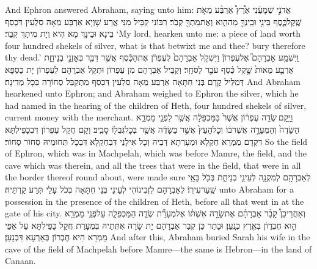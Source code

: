 {And Ephron answered Abraham, saying unto him:}{}
{אֲדֹנִ֣י שְׁמָעֵ֔נִי אֶ֩רֶץ֩ אַרְבַּ֨ע מֵאֹ֧ת שֶֽׁקֶל\maqqaf כֶּ֛סֶף בֵּינִ֥י וּבֵֽינְךָ֖ מַה\maqqaf הִ֑וא וְאֶת\maqqaf מֵתְךָ֖ קְבֹֽר׃}
{רִבּוֹנִי קַבֵּיל מִנִּי אֲרַע שָׁוְיָא אַרְבַּע מְאָה סִלְעִין דִּכְסַף בֵּינָא וּבֵינָךְ מָא הִיא וְיָת מִיתָךְ קְבַר׃}
{‘My lord, hearken unto me: a piece of land worth four hundred shekels of silver, what is that betwixt me and thee? bury therefore thy dead.’}{}
{וַיִּשְׁמַ֣ע אַבְרָהָם֮ אֶל\maqqaf עֶפְרוֹן֒ וַיִּשְׁקֹ֤ל אַבְרָהָם֙ לְעֶפְרֹ֔ן אֶת\maqqaf הַכֶּ֕סֶף אֲשֶׁ֥ר דִּבֶּ֖ר בְּאׇזְנֵ֣י בְנֵי\maqqaf חֵ֑ת אַרְבַּ֤ע מֵאוֹת֙ שֶׁ֣קֶל כֶּ֔סֶף עֹבֵ֖ר לַסֹּחֵֽר׃}
{וְקַבֵּיל אַבְרָהָם מִן עֶפְרוֹן וּתְקַל אַבְרָהָם לְעֶפְרוֹן יָת כַּסְפָּא דְּמַלֵּיל קֳדָם בְּנֵי חִתָּאָה אַרְבַּע מְאָה סִלְעִין דִּכְסַף מִתְקַבַּל סְחוֹרָה בְּכָל מְדִינָה׃}
{And Abraham hearkened unto Ephron; and Abraham weighed to Ephron the silver, which he had named in the hearing of the children of Heth, four hundred shekels of silver, current money with the merchant.}{}
{וַיָּ֣קׇם \legarmeh  שְׂדֵ֣ה עֶפְר֗וֹן אֲשֶׁר֙ בַּמַּכְפֵּלָ֔ה אֲשֶׁ֖ר לִפְנֵ֣י מַמְרֵ֑א הַשָּׂדֶה֙ וְהַמְּעָרָ֣ה אֲשֶׁר\maqqaf בּ֔וֹ וְכׇל\maqqaf הָעֵץ֙ אֲשֶׁ֣ר בַּשָּׂדֶ֔ה אֲשֶׁ֥ר בְּכׇל\maqqaf גְּבֻל֖וֹ סָבִֽיב׃}
{וְקָם חֲקַל עֶפְרוֹן דִּבְכָפֵילְתָּא דִּקְדָם מַמְרֵא חַקְלָא וּמְעָרְתָא דְּבֵיהּ וְכָל אִילָנֵי דִּבְחַקְלָא דִּבְכָל תְּחוּמֵיהּ סְחוֹר סְחוֹר׃}
{So the field of Ephron, which was in Machpelah, which was before Mamre, the field, and the cave which was therein, and all the trees that were in the field, that were in all the border thereof round about, were made sure}{}
{לְאַבְרָהָ֥ם לְמִקְנָ֖ה לְעֵינֵ֣י בְנֵי\maqqaf חֵ֑ת בְּכֹ֖ל בָּאֵ֥י שַֽׁעַר\maqqaf עִירֽוֹ׃}
{לְאַבְרָהָם לִזְבִינוֹהִי לְעֵינֵי בְּנֵי חִתָּאָה בְּכֹל עָלֵי תְּרַע קַרְתֵּיהּ׃}
{unto Abraham for a possession in the presence of the children of Heth, before all that went in at the gate of his city.}{}
{וְאַחֲרֵי\maqqaf כֵן֩ קָבַ֨ר אַבְרָהָ֜ם אֶת\maqqaf שָׂרָ֣ה אִשְׁתּ֗וֹ אֶל\maqqaf מְעָרַ֞ת שְׂדֵ֧ה הַמַּכְפֵּלָ֛ה עַל\maqqaf פְּנֵ֥י מַמְרֵ֖א הִ֣וא חֶבְר֑וֹן בְּאֶ֖רֶץ כְּנָֽעַן׃}
{וּבָתַר כֵּן קְבַר אַבְרָהָם יָת שָׂרָה אִתְּתֵיהּ בִּמְעָרַת חֲקַל כָּפֵילְתָּא עַל אַפֵּי מַמְרֵא הִיא חֶבְרוֹן בְּאַרְעָא דִּכְנָעַן׃}
{And after this, Abraham buried Sarah his wife in the cave of the field of Machpelah before Mamre—the same is Hebron—in the land of Canaan.}{}

